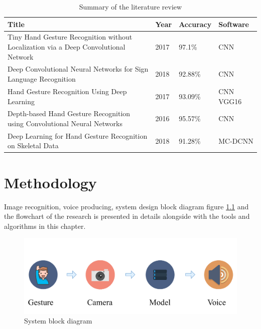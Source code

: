 \documentclass[12pt]{report}
\begin{document}
\begin{center}
    \begin{table}[h]
        \caption{Summary of the literature review}
        \begin{tabular}{ |p{7cm}|p{2cm}|p{2cm}|p{3cm}| }
            \hline
            Title & Year & Accuracy & Software\\
            \hline
            Tiny Hand Gesture Recognition without Localization via a 
            Deep Convolutional Network & 2017 & 97.1\%& CNN \\
            \hline
            Deep Convolutional Neural Networks for Sign Language 
            Recognition & 2018 & 92.88\% & CNN \\
            \hline
            Hand Gesture Recognition Using Deep Learning & 2017 & 93.09\% & CNN VGG16 \\
            \hline
            Depth-based Hand Gesture Recognition using 
            Convolutional Neural Networks & 2016 & 95.57\% & CNN \\
            \hline
            Deep Learning for Hand Gesture Recognition on Skeletal 
            Data & 2018 & 91.28\% & MC-DCNN \\
            \hline
        \end{tabular}
        \label{table:summary}
    \end{table}
\end{center}
\newpage

\chapter{Methodology}

Image recognition, voice producing, 
system design block diagram figure \ref{fig:system_diagram} 
and the flowchart of the research is presented in details 
alongside with the tools and algorithms in this chapter.


\begin{figure}[h]
    \centering
    \includegraphics[width=\textwidth]{./images/system_diagram.png}
    \caption{System block diagram}
    \label{fig:system_diagram}
\end{figure}
\end{document}
